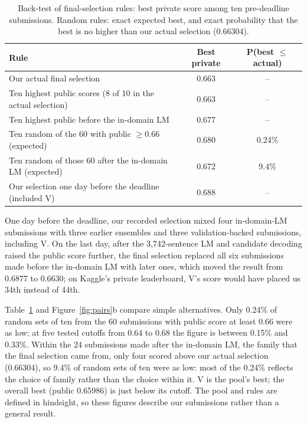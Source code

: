 \documentclass{article}
\begin{document}
\begin{table}[t]
  \caption{Back-test of final-selection rules: best private score among ten pre-deadline submissions. Random rules: exact expected best, and exact probability that the best is no higher than our actual selection (0.66304).}
  \label{tab:select}
  \centering
  \begin{tabular}{lcc}
    \toprule
    Rule & Best private & P(best $\leq$ actual) \\
    \midrule
    Our actual final selection & 0.663 & -- \\
    Ten highest public scores (8 of 10 in the actual selection) & 0.663 & -- \\
    Ten highest public before the in-domain LM & 0.677 & -- \\
    Ten random of the 60 with public $\geq 0.66$ (expected) & 0.680 & 0.24\% \\
    Ten random of those 60 after the in-domain LM (expected) & 0.672 & 9.4\% \\
    Our selection one day before the deadline (included V) & 0.688 & -- \\
    \bottomrule
  \end{tabular}
\end{table}

One day before the deadline, our recorded selection mixed four in-domain-LM submissions with three earlier ensembles and three validation-backed submissions, including V. On the last day, after the 3{,}742-sentence LM and candidate decoding raised the public score further, the final selection replaced all six submissions made before the in-domain LM with later ones, which moved the result from 0.6877 to 0.6630; on Kaggle's private leaderboard, V's score would have placed us 34th instead of 44th.

Table~\ref{tab:select} and Figure~\ref{fig:pairs}b compare simple alternatives. Only 0.24\% of random sets of ten from the 60 submissions with public score at least 0.66 were as low; at five tested cutoffs from 0.64 to 0.68 the figure is between 0.15\% and 0.33\%. Within the 24 submissions made after the in-domain LM, the family that the final selection came from, only four scored above our actual selection (0.66304), so 9.4\% of random sets of ten were as low: most of the 0.24\% reflects the choice of family rather than the choice within it. V is the pool's best; the overall best (public 0.65986) is just below its cutoff. The pool and rules are defined in hindsight, so these figures describe our submissions rather than a general result.
\end{document}
